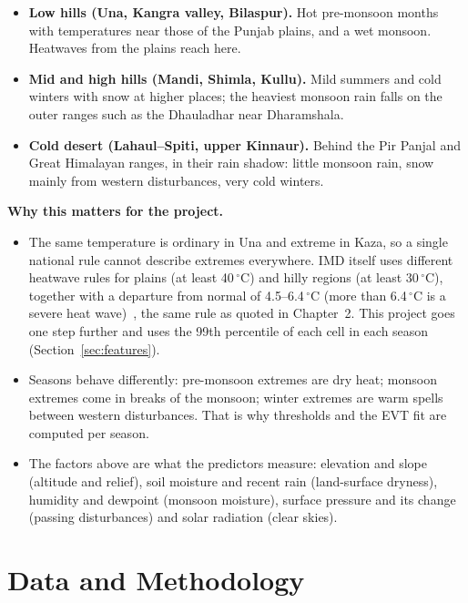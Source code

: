 \documentclass[12pt,a4paper]{report}
\begin{document}
\begin{itemize}
\item \textbf{Low hills (Una, Kangra valley, Bilaspur).} Hot pre-monsoon months with temperatures near those of the
Punjab plains, and a wet monsoon. Heatwaves from the plains reach here.
\item \textbf{Mid and high hills (Mandi, Shimla, Kullu).} Mild summers and cold winters with snow at higher places;
the heaviest monsoon rain falls on the outer ranges such as the Dhauladhar near Dharamshala.
\item \textbf{Cold desert (Lahaul--Spiti, upper Kinnaur).} Behind the Pir Panjal and Great Himalayan ranges, in their
rain shadow: little monsoon rain, snow mainly from western disturbances, very cold winters.
\end{itemize}

\textbf{Why this matters for the project.}
\begin{itemize}
\item The same temperature is ordinary in Una and extreme in Kaza, so a single national rule cannot describe extremes
everywhere. IMD itself uses different heatwave rules for plains (at least 40\,$^\circ$C) and hilly regions (at least
30\,$^\circ$C), together with a departure from normal of 4.5--6.4\,$^\circ$C (more than 6.4\,$^\circ$C is a severe heat
wave)~\cite{imdheatdef}, the same rule as quoted in Chapter~2. This project goes
one step further and uses the 99th percentile of each cell in each season (Section~\ref{sec:features}).
\item Seasons behave differently: pre-monsoon extremes are dry heat; monsoon extremes come in breaks of the monsoon;
winter extremes are warm spells between western disturbances. That is why thresholds and the EVT fit are computed per
season.
\item The factors above are what the predictors measure: elevation and slope (altitude and relief), soil moisture and
recent rain (land-surface dryness), humidity and dewpoint (monsoon moisture), surface pressure and its change
(passing disturbances) and solar radiation (clear skies).
\end{itemize}

\chapter{Data and Methodology}
\label{ch:method}
\end{document}
